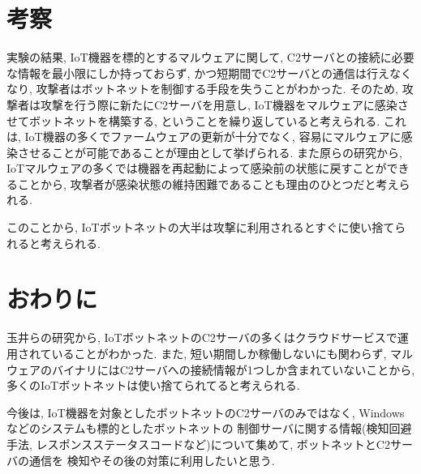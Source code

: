 \documentclass[twocolumn,10pt]{ltjsarticle}
\begin{document}
\section{考察}
実験の結果, IoT機器を標的とするマルウェアに関して, C2サーバとの接続に必要な情報を最小限にしか持っておらず, 
かつ短期間でC2サーバとの通信は行えなくなり, 攻撃者はボットネットを制御する手段を失うことがわかった. 
そのため, 攻撃者は攻撃を行う際に新たにC2サーバを用意し, IoT機器をマルウェアに感染させてボットネットを構築する, 
ということを繰り返していると考えられる. これは, IoT機器の多くでファームウェアの更新が十分でなく, 
容易にマルウェアに感染させることが可能であることが理由として挙げられる. また原らの研究\cite{原悟史2019感染持続型}から, 
IoTマルウェアの多くでは機器を再起動によって感染前の状態に戻すことができることから, 
攻撃者が感染状態の維持困難であることも理由のひとつだと考えられる. \par
このことから, IoTボットネットの大半は攻撃に利用されるとすぐに使い捨てられると考えられる. 

\section{おわりに}
玉井らの研究から, IoTボットネットのC2サーバの多くはクラウドサービスで運用されていることがわかった. 
また, 短い期間しか稼働しないにも関わらず, マルウェアのバイナリにはC2サーバへの接続情報が1つしか含まれていないことから, 
多くのIoTボットネットは使い捨てられてると考えられる. \par
今後は, IoT機器を対象としたボットネットのC2サーバのみではなく, Windowsなどのシステムも標的としたボットネットの
制御サーバに関する情報(検知回避手法, レスポンスステータスコードなど)について集めて, ボットネットとC2サーバの通信を
検知やその後の対策に利用したいと思う. 



\end{document}
